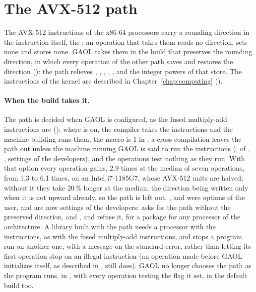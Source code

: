 \section{The AVX-512 path}\label{sec:avx512}
%

The AVX-512 instructions of the x86-64 processors carry a rounding direction
in the instruction itself, the : an operation that
takes them reads no direction, sets none and stores none. GAOL takes them in
the build that preserves the rounding direction, in which every operation of
the other path saves and restores the direction
(): the path relieves \code{+}, \code{-},
\code{*}, \code{/}, ,  and the integer powers of that
store.\newinvfive{} The instructions of the kernel are described in
Chapter~\ref{chap:computing} ().

\medskip
\paragraph{When the build takes it.} The path is decided when GAOL is configured,
as the fused multiply-add instructions are (): where
 is on, the compiler takes the instructions
and the machine building runs them, the macro 
is 1 in ; a cross-compilation leaves the path
out unless the machine running GAOL is said to run the instructions
(,  of
, , settings of the developers),
and the operations test nothing as they run. With that option
every operation gains, 2.9 times at the median of seven operations, from 1.3
to 6.1 times, on an Intel i7-1185G7, whose AVX-512 units are halved; without
it they take 20\,\% longer at the median, the direction being written only
when it is not upward already, so the path is left out. ,
 and  were
options of the user, and are now settings of the developers:\newinvfive{}
 asks for the path without the preserved direction, and
,  and
 refuse it, for a package for any
processor of the architecture. A library built with the path needs a processor
with the instructions, as with the fused multiply-add instructions, and
 stops a program run on another one, with a message on the
standard error, rather than letting its first operation stop on an illegal
instruction (an operation made before GAOL initializes itself, as described
in , still does). GAOL no longer chooses the path as the
program runs, in , with every operation testing the flag it set,
in the default build too.\newinvfive

